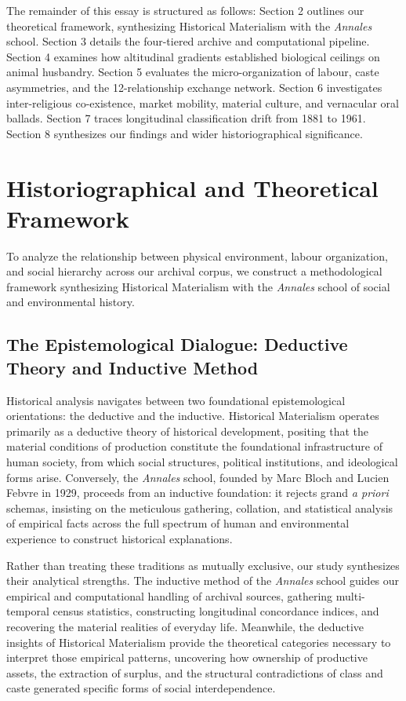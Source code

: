 \documentclass[11pt,a4paper]{article}
\begin{document}
The remainder of this essay is structured as follows: Section 2 outlines our theoretical framework, synthesizing Historical Materialism with the \textit{Annales} school. Section 3 details the four-tiered archive and computational pipeline. Section 4 examines how altitudinal gradients established biological ceilings on animal husbandry. Section 5 evaluates the micro-organization of labour, caste asymmetries, and the 12-relationship exchange network. Section 6 investigates inter-religious co-existence, market mobility, material culture, and vernacular oral ballads. Section 7 traces longitudinal classification drift from 1881 to 1961. Section 8 synthesizes our findings and wider historiographical significance.

\section{Historiographical and Theoretical Framework}

To analyze the relationship between physical environment, labour organization, and social hierarchy across our archival corpus, we construct a methodological framework synthesizing Historical Materialism with the \textit{Annales} school of social and environmental history.

\subsection{The Epistemological Dialogue: Deductive Theory and Inductive Method}
Historical analysis navigates between two foundational epistemological orientations: the deductive and the inductive. Historical Materialism operates primarily as a deductive theory of historical development, positing that the material conditions of production constitute the foundational infrastructure of human society, from which social structures, political institutions, and ideological forms arise. Conversely, the \textit{Annales} school, founded by Marc Bloch and Lucien Febvre in 1929, proceeds from an inductive foundation: it rejects grand \textit{a priori} schemas, insisting on the meticulous gathering, collation, and statistical analysis of empirical facts across the full spectrum of human and environmental experience to construct historical explanations.

Rather than treating these traditions as mutually exclusive, our study synthesizes their analytical strengths. The inductive method of the \textit{Annales} school guides our empirical and computational handling of archival sources, gathering multi-temporal census statistics, constructing longitudinal concordance indices, and recovering the material realities of everyday life. Meanwhile, the deductive insights of Historical Materialism provide the theoretical categories necessary to interpret those empirical patterns, uncovering how ownership of productive assets, the extraction of surplus, and the structural contradictions of class and caste generated specific forms of social interdependence.
\end{document}
